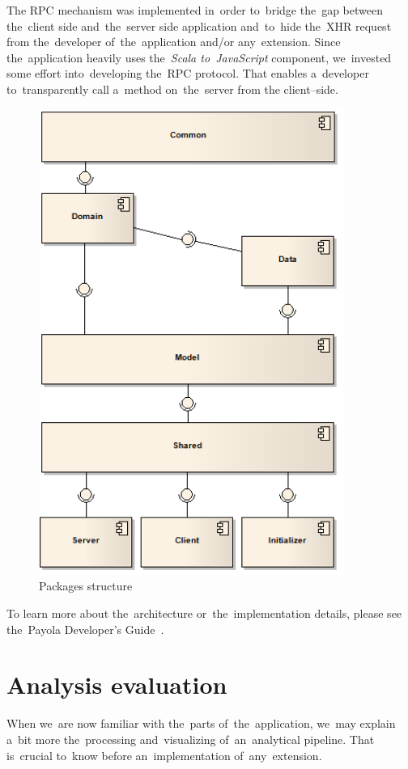 The RPC mechanism was implemented in~order to~bridge the~gap between the~client 
side and~the~server side application and~to~hide the~XHR request from
the~developer of~the~application and/or any~extension. Since the~application heavily
uses the~\emph{Scala to~JavaScript} component, we~invested some effort into~developing the~RPC 
protocol. That enables a~developer to~transparently call a~method on~the~server from 
the client--side. 

\begin{figure}
	\centering
	\includegraphics[width=100mm]{images/project_dependencies.png}
	\caption{Packages structure}
	\label{fig:packages-structure}
\end{figure}

To learn more about the~architecture or~the~implementation details, please see the~Payola Developer's Guide~\cite{payola:dg}.

\section{Analysis evaluation}
When we~are now familiar with the~parts of~the~application, we~may explain a~bit more the~processing and~visualizing of~an~analytical pipeline. That is~crucial to~know before an~implementation of~any~extension.

